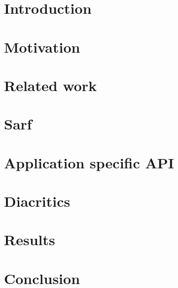 \documentclass[3p,times,procedia]{elsarticle}
\begin{document}
\section{Introduction}
\label{sec:intro}


\section{Motivation}
\label{sec:motivation}


\section{Related work}
\label{sec:related}


\section{Sarf}
\label{sec:overview}


\section{Application specific API}
\label{sec:api}


%

%

\section{Diacritics}
\label{sec:diac}


\section{Results}
\label{sec:results}


\section{Conclusion}
\label{sec:conclusion}


{\footnotesize
%


}

\end{document}
